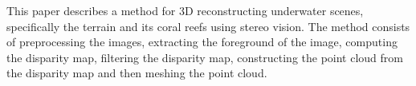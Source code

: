 
This paper describes a method for 3D reconstructing underwater scenes, 
specifically the terrain and its coral reefs using stereo vision. The method
 consists of preprocessing the images, extracting the foreground of the image,
 computing the disparity map, filtering the disparity map, constructing the point cloud
  from the disparity map and then meshing the point cloud.